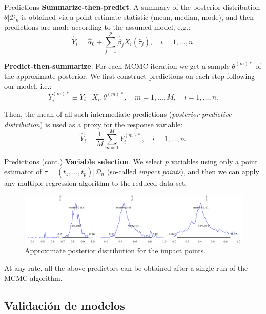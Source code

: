 \documentclass[10pt, english, professionalfonts]{beamer}
\begin{document}
\begin{frame}{Predictions}
  \textbf{Summarize-then-predict}. A summary of the posterior distribution \(\theta| \mathcal D_n\) is obtained via a point-estimate statistic (mean, median, mode), and then predictions are made according to the assumed model, e.g.:
  \[
  \hat Y_i =\hat \alpha_0 + \sum_{j=1}^p \hat \beta_j X_i(\hat \tau_j), \quad i=1,\dots, n.
  \]

  \textbf{Predict-then-summarize}. For each MCMC iteration we get a sample \(\theta^{(m)*}\) of the approximate posterior. We first construct predictions on each step following our model, i.e.:
  \[
    Y_i^{(m)*} \equiv Y_i \mid X_i, \theta^{(m)*}, \quad m=1,\dots,M, \quad i=1,\dots, n.
  \]

  Then, the mean of all such intermediate predictions (\textit{posterior predictive distribution}) is used as a proxy for the response variable:
  \[
    \hat Y_i = \frac{1}{M}\sum_{m=1}^M Y_i^{(m)*}, \quad i=1,\dots, n.
  \]

\end{frame}

\begin{frame}{Predictions (cont.)}
    \textbf{Variable selection}. We select \(p\) variables using only a point estimator of \(\tau=(t_1,\dots, t_p)|\mathcal D_n\) (so-called \textit{impact points}), and then we can apply any multiple regression algorithm to the reduced data set.
    \vspace{1em}

    \begin{figure}
      \includegraphics[width=\textwidth]{img/tau_posterior}
      \caption{Approximate posterior distribution for the impact points.}
    \end{figure}

    At any rate, all the above predictors can be obtained after a single run of the MCMC algorithm.
\end{frame}

\subsection{Validación de modelos}
\end{document}
